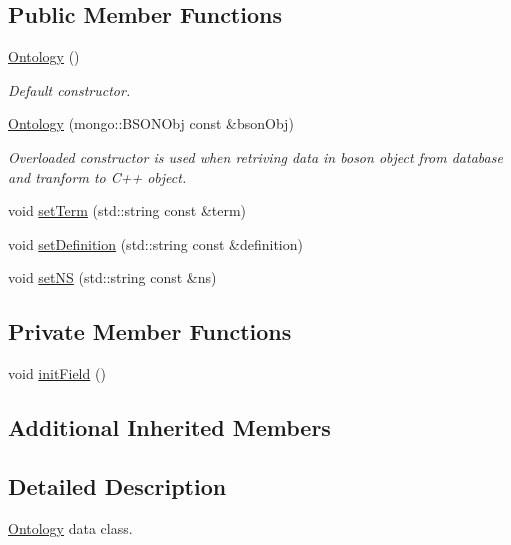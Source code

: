 \subsection*{Public Member Functions}
\begin{DoxyCompactItemize}
\item 
\hyperlink{classunisys_1_1Ontology_ac06bef5e383945da202ab2e520a57743}{Ontology} ()
\begin{DoxyCompactList}\small\item\em Default constructor. \end{DoxyCompactList}\item 
\hyperlink{classunisys_1_1Ontology_a2863117154f8956d467ec670085d039e}{Ontology} (mongo\-::\-B\-S\-O\-N\-Obj const \&bson\-Obj)
\begin{DoxyCompactList}\small\item\em Overloaded constructor is used when retriving data in boson object from database and tranform to C++ object. \end{DoxyCompactList}\item 
void \hyperlink{classunisys_1_1Ontology_a596d20a8d63b48d41859494f223f6189}{set\-Term} (std\-::string const \&term)
\item 
void \hyperlink{classunisys_1_1Ontology_a1af4e5d96284a958ddd1d5fc7a0445cf}{set\-Definition} (std\-::string const \&definition)
\item 
void \hyperlink{classunisys_1_1Ontology_a8735c51449d33f90e754ef4b0addd8b2}{set\-N\-S} (std\-::string const \&ns)
\end{DoxyCompactItemize}
\subsection*{Private Member Functions}
\begin{DoxyCompactItemize}
\item 
void \hyperlink{classunisys_1_1Ontology_a42f1c4257f60144420b1bc9ac128b5cc}{init\-Field} ()
\end{DoxyCompactItemize}
\subsection*{Additional Inherited Members}


\subsection{Detailed Description}
\hyperlink{classunisys_1_1Ontology}{Ontology} data class. 

